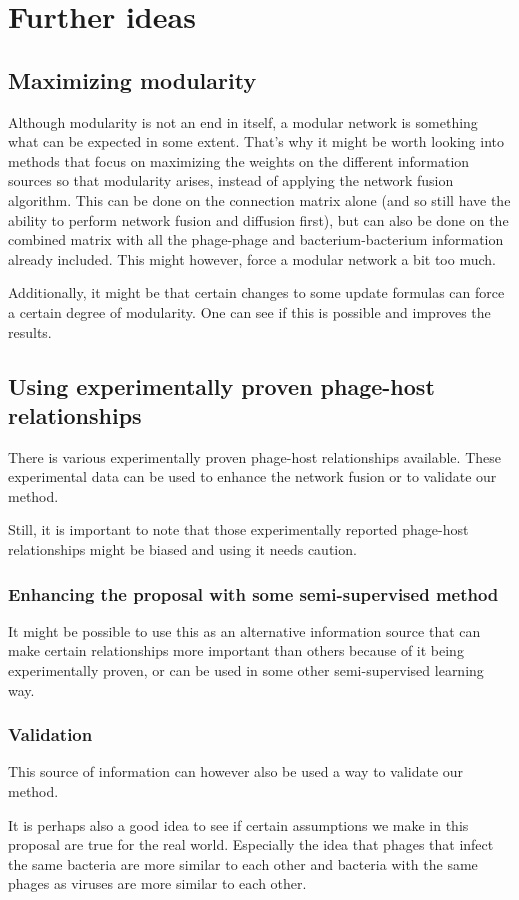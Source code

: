 \documentclass{article}
\begin{document}
\section{Further ideas}

\subsection{Maximizing modularity}

Although modularity is not an end in itself, a modular network is
something what can be expected in some extent.
That's why it might be worth looking into methods 
that focus on maximizing
the weights on the different information sources so that modularity arises,
instead of applying the network fusion algorithm.
This can be done on the connection matrix alone 
(and so still have the ability to perform network fusion and diffusion first),
but can also be done on the combined matrix with 
all the phage-phage and bacterium-bacterium information already included.  
This might however, force a modular network a bit too much.

Additionally, it might be that certain changes to some update formulas can
force a certain degree of modularity. One can see if this is possible and
improves the results.

\subsection{Using experimentally proven phage-host relationships}

There is various experimentally proven phage-host relationships available. 
These experimental data can be used to enhance the network fusion or 
to validate our method. 

Still, it is important to note that those experimentally reported phage-host
relationships might be biased and using it needs caution.

\subsubsection{Enhancing the proposal with some semi-supervised method}

It might be possible to use this as an alternative information source that
can make certain relationships more important than others because
of it being experimentally proven, or can be used in some other semi-supervised
learning way.

\subsubsection{Validation}

This source of information can however also be used a way to validate
our method. 

It is perhaps also a good idea to see if certain assumptions we make in 
this proposal are true for the real world. 
Especially the idea that phages that infect the same
bacteria are more similar to each other and bacteria with the same phages
as viruses are more similar to each other.

\printbibliography{}
\end{document}

